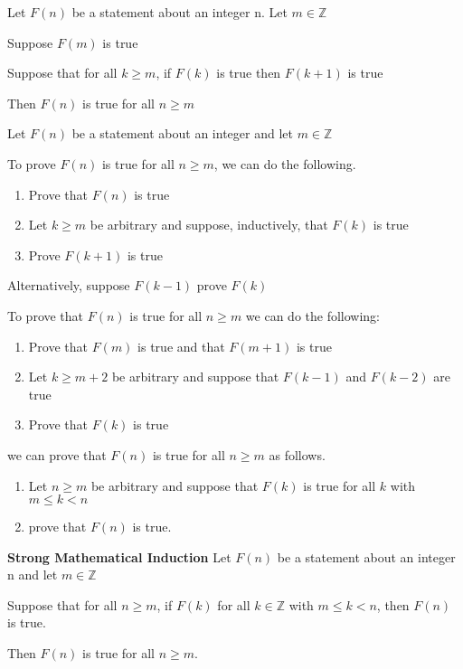 


\begin{thm}
Let $F(n)$ be a statement about an integer n. Let $m\in \mathbb{Z}$

Suppose $F(m)$ is true 

Suppose that for all $k\geq m$, if $F(k)$ is true then $F(k+1)$ is true 

Then $F(n)$ is true for all $n\geq m$

\end{thm}

Let $F(n)$ be a statement about an integer and let $m\in \mathbb{Z}$

To prove $F(n)$ is true for all $n\geq m$, we can do the following.

\begin{enumerate}
\item Prove that $F(n)$ is true
\item Let $k\geq m$ be arbitrary and suppose, inductively, that $F(k)$ is true
\item Prove $F(k+1)$ is true
\end{enumerate}

Alternatively, suppose $F(k-1)$ prove $F(k)$

To prove that $F(n)$ is true for all $n\geq m$ we can do the following:
\begin{enumerate}
\item Prove that $F(m)$ is true and that $F(m+1)$ is true
\item Let $k\geq m+2$ be arbitrary and suppose that $F(k-1)$ and $F(k-2)$ are true
\item Prove that $F(k)$ is true
\end{enumerate}

we can prove that $F(n)$ is true for all $n\geq m$ as follows.

\begin{enumerate}
\item Let $n\geq m$ be arbitrary and suppose that $F(k)$ is true for all $k$ with $m\leq k < n$
\item prove that $F(n)$ is true.
\end{enumerate}


\begin{thm}

\textbf{Strong Mathematical Induction}
Let $F(n)$ be a statement about an integer n and let $m\in \mathbb{Z}$

Suppose that for all $n\geq m$, if $F(k)$ for all $k\in \mathbb{Z}$ with $m\leq k < n$, then $F(n)$ is true.

Then $F(n)$ is true for all $n\geq m$.

\end{thm}

